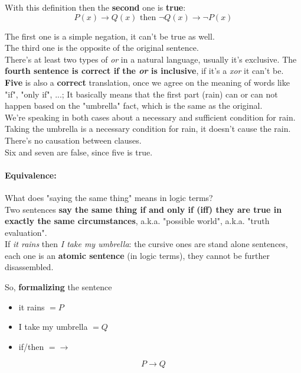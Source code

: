 \documentclass[11pt]{article}
\begin{document}
	\newpage
	
	With this definition then the \textbf{second} one is \textbf{true}: 
	$$ P(x) \rightarrow Q(x) \text{ then } \neg Q(x) \rightarrow \neg P(x) $$
	
	The first one is a simple negation, it can't be true as well. \\
	
	The third one is the opposite of the original sentence. \\
	
	There's at least two types of \textit{or} in a natural language, usually it's exclusive. The \textbf{fourth sentence is correct if the \textit{or} is inclusive}, if it's a \textit{xor} it can't be. \\
	
	\textbf{Five} is also a \textbf{correct} translation, once we agree on the meaning of words like "if", "only if", ...; It basically means that the first part (rain) can or can not happen based on the "umbrella" fact, which is the same as the original. \\
	We're speaking in both cases about a necessary and sufficient condition for rain. Taking the umbrella is a necessary condition for rain, it doesn't cause the rain. There's no causation between clauses. \\
	
	Six and seven are false, since five is true. \\
	
	
	\paragraph{Equivalence:} What does "saying the same thing" means in logic terms? \\
	Two sentences \textbf{say the same thing if and only if (iff) they are true in exactly the same circumstances}, a.k.a. "possible world", a.k.a. "truth evaluation". \\
	
	If \textit{it rains} then \textit{I take my umbrella}: the cursive ones are stand alone sentences, each one is an \textbf{atomic sentence} (in logic terms), they cannot be further disassembled. \\
	
	\newpage
	
	So, \textbf{formalizing} the sentence
	\begin{itemize}
		\item it rains $= P$
		\item I take my umbrella $= Q$
		\item if/then $= \rightarrow$
	\end{itemize}
	$$ P \rightarrow Q $$
	
\end{document}
